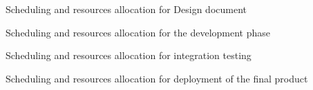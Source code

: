 \documentclass[a4paper,11pt]{report} %
\begin{document}
		\begin{center}
			Scheduling and resources allocation for Design document
		\end{center}
		\begin{minipage}{\linewidth}
		\end{minipage}		
		\begin{center}
			Scheduling and resources allocation for the development phase
		\end{center}
		\begin{minipage}{\linewidth}
		\end{minipage}	
		\begin{center}
			Scheduling and resources allocation for integration testing
		\end{center}		
		\begin{minipage}{\linewidth}
		\end{minipage}	
		\begin{center}
			Scheduling and resources allocation for deployment of the final product
		\end{center}	
		\begin{minipage}{\linewidth}
		\end{minipage}
\end{document}

